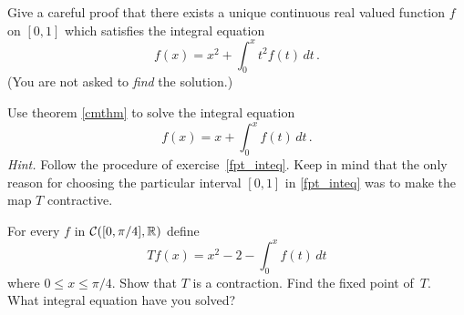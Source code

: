 \begin{prob} Give a careful proof that there exists a unique continuous real valued
function $f$ on $[0,1]$ which satisfies the integral equation
  \[ f(x) =  x^2 + \int_0^x t^2 f(t)\,dt\,. \]
(You are not asked to \emph{find} the solution.)
\end{prob}

\begin{prob} Use theorem \ref{cmthm} to solve the integral equation
  \[ f(x) =  x + \int_0^x f(t)\,dt\,. \]
\emph{Hint.} Follow the procedure of exercise~\ref{fpt_inteq}. Keep in mind that the only
reason for choosing the particular interval $[0,1]$ in \ref{fpt_inteq} was to make the
map $T$ contractive.
\end{prob}

\begin{prob} For every $f$ in $\mathcal{C}([0,\pi/4],\mathbb{R})$  define
  \[ Tf(x) =  x^2 - 2 - \int_0^x f(t)\,dt \]
where $0 \le x \le \pi/4$.  Show that $T$ is a contraction. Find the fixed point of~$T$.
What integral equation have you solved?
\end{prob}




\endinput

